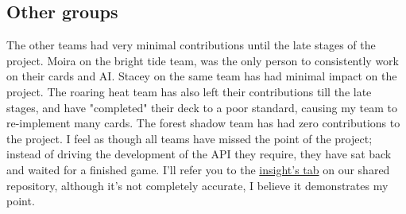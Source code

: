 \documentclass[a4paper]{article}
\begin{document}
\subsection{Other groups}
The other teams had very minimal contributions until the late stages of the project. Moira on the bright tide team, was the only person to consistently work on their cards and AI. Stacey on the same team has had minimal impact on the project. The roaring heat team has also left their contributions till the late stages, and have "completed" their deck to a poor standard, causing my team to re-implement many cards. The forest shadow team has had zero contributions to the project. I feel as though all teams have missed the point of the project; instead of driving the development of the API they require, they have sat back and waited for a finished game. I'll refer you to the \href{https://github.com/nitronoid/PokemonTCG/graphs/contributors}{insight's tab} on our shared repository, although it's not completely accurate, I believe it demonstrates my point.
\end{document}
